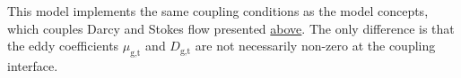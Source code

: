 
This model implements the same coupling conditions as the model
concepts, which couples Darcy and Stokes flow presented \hyperref[sc_2cstokes2p2c]{above}.
The only difference is that the eddy coefficients $\mu_\textrm{g,t}$
and $D_\textrm{g,t}$ are not necessarily non-zero at the coupling
interface.
